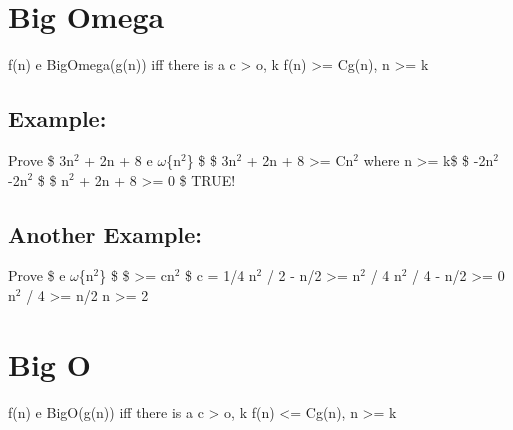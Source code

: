 \documentclass[11pt]{article}
\author{davec}
\date{\today}
\title{}
\begin{document}
\tableofcontents

\section{Big Omega}
\label{sec:org6b9f06d}
f(n) e BigOmega(g(n)) iff there is a c > o, k
f(n) >= Cg(n), n >= k

\subsection{Example:}
\label{sec:org7d059ea}
Prove \$ 3n\(^{\text{2}}\) + 2n + 8 e \(\omega\)\{n\(^{\text{2}}\)\} \$
\$ 3n\(^{\text{2}}\) + 2n + 8 >= Cn\(^{\text{2}}\) where n >= k\$
\$ -2n\(^{\text{2}}\)           -2n\(^{\text{2}}\) \$
\$ n\(^{\text{2}}\) + 2n + 8 >= 0 \$ TRUE!

\subsection{Another Example:}
\label{sec:orgd649684}
Prove \$  e \(\omega\)\{n\(^{\text{2}}\)\} \$
\$  >= cn\(^{\text{2}}\) \$ c = 1/4
n\(^{\text{2}}\) / 2 - n/2 >= n\(^{\text{2}}\) / 4
n\(^{\text{2}}\) / 4 - n/2 >= 0
n\(^{\text{2}}\) / 4 >= n/2
n >= 2

\section{Big O}
\label{sec:org8cdaa3c}
f(n) e BigO(g(n)) iff there is a c > o, k
f(n) <= Cg(n), n >= k
\end{document}
